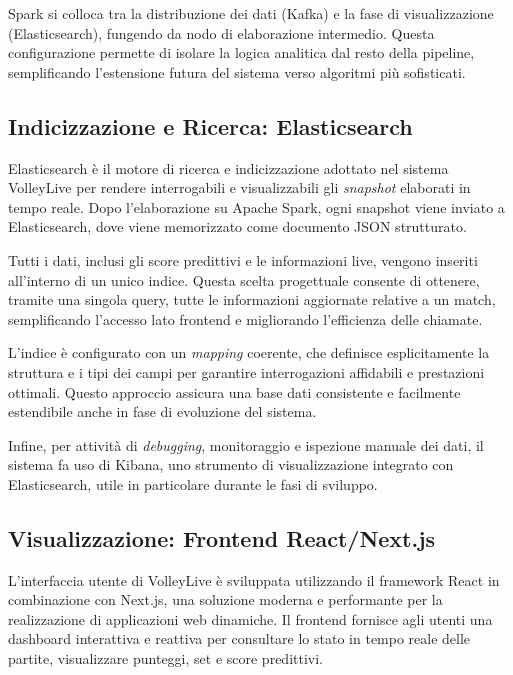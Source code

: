 \documentclass[a4paper,12pt]{report}
\begin{document}
Spark si colloca tra la distribuzione dei dati (Kafka) e la fase di visualizzazione (Elasticsearch), fungendo da nodo di elaborazione intermedio. Questa configurazione permette di isolare la logica analitica dal resto della pipeline, semplificando l’estensione futura del sistema verso algoritmi più sofisticati.


\subsection{Indicizzazione e Ricerca: Elasticsearch}

Elasticsearch è il motore di ricerca e indicizzazione adottato nel sistema VolleyLive per rendere interrogabili e visualizzabili gli \textit{snapshot} elaborati in tempo reale. Dopo l’elaborazione su Apache Spark, ogni snapshot viene inviato a Elasticsearch, dove viene memorizzato come documento JSON strutturato.

Tutti i dati, inclusi gli score predittivi e le informazioni live, vengono inseriti all’interno di un unico indice. Questa scelta progettuale consente di ottenere, tramite una singola query, tutte le informazioni aggiornate relative a un match, semplificando l’accesso lato frontend e migliorando l’efficienza delle chiamate.

L’indice è configurato con un \textit{mapping} coerente, che definisce esplicitamente la struttura e i tipi dei campi per garantire interrogazioni affidabili e prestazioni ottimali. Questo approccio assicura una base dati consistente e facilmente estendibile anche in fase di evoluzione del sistema.

Infine, per attività di \textit{debugging}, monitoraggio e ispezione manuale dei dati, il sistema fa uso di Kibana, uno strumento di visualizzazione integrato con Elasticsearch, utile in particolare durante le fasi di sviluppo.


\subsection{Visualizzazione: Frontend React/Next.js}

L’interfaccia utente di VolleyLive è sviluppata utilizzando il framework React in combinazione con Next.js, una soluzione moderna e performante per la realizzazione di applicazioni web dinamiche. Il frontend fornisce agli utenti una dashboard interattiva e reattiva per consultare lo stato in tempo reale delle partite, visualizzare punteggi, set e score predittivi.
\end{document}
